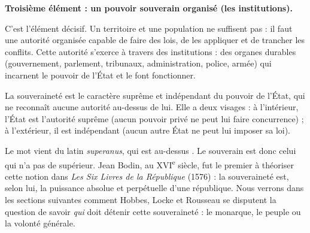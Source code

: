 \documentclass[11pt]{article}
\newcommand{\cle}[1]{{\popxbold\color{popdark}#1}}
\begin{document}
\textbf{Troisième élément : un pouvoir souverain organisé (les institutions).}\par
C'est l'élément décisif. Un territoire et une population ne suffisent pas : il faut une autorité organisée capable de faire des lois, de les appliquer et de trancher les conflits. Cette autorité s'exerce à travers des \cle{institutions} : des organes durables (gouvernement, parlement, tribunaux, administration, police, armée) qui incarnent le pouvoir de l'État et le font fonctionner.

\begin{definition}[La souveraineté]
La \cle{souveraineté} est le caractère suprême et indépendant du pouvoir de l'État, qui ne reconnaît aucune autorité au-dessus de lui. Elle a deux visages : à l'intérieur, l'État est l'autorité suprême (aucun pouvoir privé ne peut lui faire concurrence) ; à l'extérieur, il est indépendant (aucun autre État ne peut lui imposer sa loi).
\end{definition}

Le mot vient du latin \emph{superanus}, \guillemotleft qui est au-dessus \guillemotright. Le souverain est donc celui qui n'a pas de supérieur. Jean Bodin, au XVI\textsuperscript{e} siècle, fut le premier à théoriser cette notion dans \emph{Les Six Livres de la République} (1576) : la souveraineté est, selon lui, la puissance absolue et perpétuelle d'une république. Nous verrons dans les sections suivantes comment Hobbes, Locke et Rousseau se disputent la question de savoir \emph{qui} doit détenir cette souveraineté : le monarque, le peuple ou la volonté générale.
\end{document}
